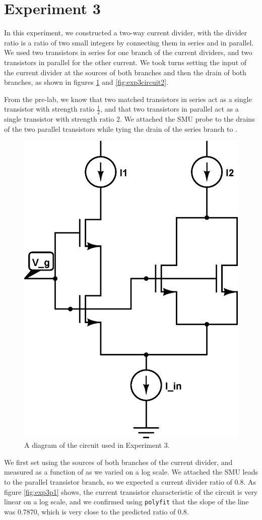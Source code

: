\section*{Experiment 3}

In this experiment, we constructed a two-way current divider, with the divider ratio is a ratio of
two small integers by connecting them in series and in parallel. We used two \nMOS transistors in series for one branch of the current dividers, and two \nMOS transistors in parallel for the other current. We took turns setting the input of the current divider at the sources of both branches and then the drain of both branches, as shown in figures \ref{fig:exp3p1dia} and \ref{fig:exp3circuit2}.

From the pre-lab, we know that two matched transistors in series act as a single \nMOS transistor with strength ratio $\frac{1}{2}$, and that two \nMOS transistors in parallel act as a single \nMOS transistor with strength ratio 2. We attached the SMU probe to the drains of the two parallel \nMOS transistors while tying the drain of the series \nMOS branch to \Vdd. 

\begin{figure}[H]
\centering
\includegraphics[width=0.45\linewidth]{../Figures/Experiment3CircuitDiagram1.eps}
\caption{A diagram of the circuit used in Experiment 3.}
\label{fig:exp3p1dia}	
\end{figure}

We first set \Iin using the sources of both branches of the current divider, and measured \Iout as a function of \Iin as we varied \Iin on a log scale. We attached the SMU leads to the parallel transistor branch, so we expected a current divider ratio of 0.8. As figure \ref{fig:exp3p1} shows, the current transistor characteristic of the circuit is very linear on a log scale, and we confirmed using \texttt{polyfit} that the slope of the line was 0.7870, which is very close to the predicted ratio of 0.8.

